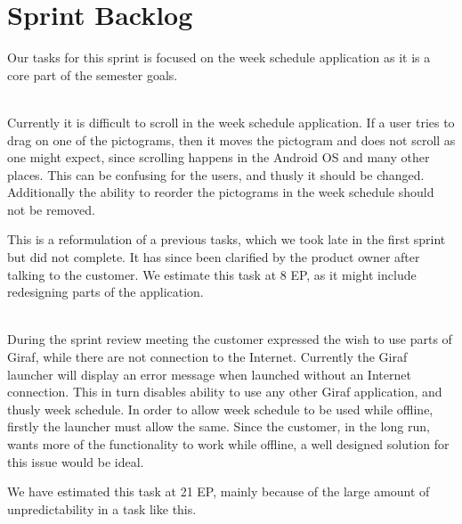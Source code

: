 \section{Sprint Backlog}\label{plan2}
Our tasks for this sprint is focused on the week schedule application as it is a core part of the semester goals.
\begin{description}[style=unboxed]
    \item[{[}\phigh{]} Week Schedule -- Long Schedules] \hfill \\ 
    Currently it is difficult to scroll in the week schedule application.
    If a user tries to drag on one of the pictograms, then it moves the pictogram and does not scroll as one might expect, since scrolling happens in the Android OS and many other places. 
    This can be confusing for the users, and thusly it should be changed. 
    Additionally the ability to reorder the pictograms in the week schedule should not be removed. 

    This is a reformulation of a previous tasks, which we took late in the first sprint but did not complete. 
    It has since been clarified by the product owner after talking to the customer. 
    We estimate this task at 8 EP, as it might include redesigning parts of the application. 
    \item[{[}\phigh{]} Week Schedule -- Offline Usage] \hfill \\ 
    During the sprint review meeting the customer expressed the wish to use parts of Giraf, while there are not connection to the Internet. 
    Currently the Giraf launcher will display an error message when launched without an Internet connection. 
    This in turn disables ability to use any other Giraf application, and thusly week schedule. 
    In order to allow week schedule to be used while offline, firstly the launcher must allow the same. 
    Since the customer, in the long run, wants more of the functionality to work while offline, a well designed solution for this issue would be ideal. 

    We have estimated this task at 21 EP, mainly because of the large amount of unpredictability in a task like this. 


\end{description}
